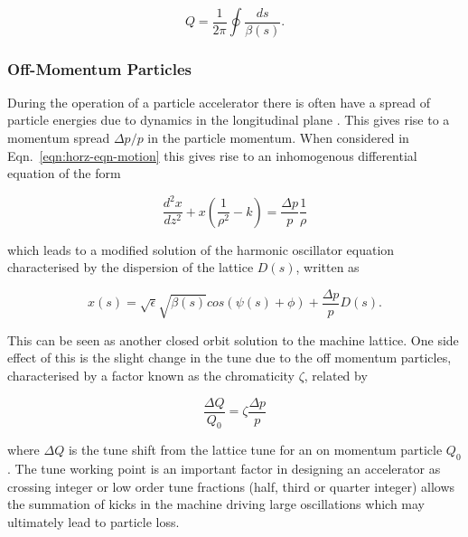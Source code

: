 \begin{equation}
Q = \frac{1}{2\pi} \oint \frac{ds}{\beta \left( s \right)}.
\end{equation}

\subsubsection{Off-Momentum Particles}

During the operation of a particle accelerator there is often have a spread of particle energies due to dynamics in the longitudinal plane \cite{Leduff:LongDyn}. This gives rise to a momentum spread $\Delta p/p$ in the particle momentum. When considered in Eqn.~\ref{eqn:horz-eqn-motion} this gives rise to an inhomogenous differential equation of the form

\begin{equation}
\frac{d^{2}x}{dz^{2}} + x \left( \frac{1}{\rho^{2}} - k\right)  = \frac{\Delta p}{p}\frac{1}{\rho}
\label{eqn:disp-eqn-motion}
\end{equation}

which leads to a modified solution of the harmonic oscillator equation characterised by the dispersion of the lattice $D(s)$, written as

\begin{equation}
x \left( s \right) = \sqrt{\epsilon} \sqrt{\beta \left( s \right) } cos \left( \psi \left( s \right) + \phi \right) + \frac{\Delta p}{p} D \left( s \right).
\end{equation}

This can be seen as another closed orbit solution to the machine lattice. One side effect of this is the slight change in the tune due to the off momentum particles, characterised by a factor known as the chromaticity $\zeta$, related by

\begin{equation}
\frac{\Delta Q}{Q_{0}} = \zeta \frac{\Delta p}{p}
\end{equation}

where $\Delta Q$ is the tune shift from the lattice tune for an on momentum particle $Q_{0}$. The tune working point is an important factor in designing an accelerator as crossing integer or low order tune fractions (half, third or quarter integer) allows the summation of kicks in the machine driving large oscillations which may ultimately lead to particle loss. 
